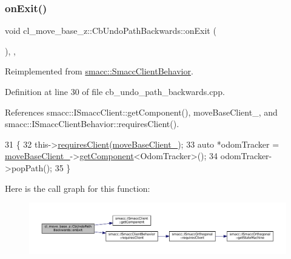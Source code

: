\subsubsection{\texorpdfstring{on\+Exit()}{onExit()}}
{\footnotesize\ttfamily void cl\+\_\+move\+\_\+base\+\_\+z\+::\+Cb\+Undo\+Path\+Backwards\+::on\+Exit (\begin{DoxyParamCaption}{ }\end{DoxyParamCaption})\hspace{0.3cm}{\ttfamily [override]}, {\ttfamily [private]}, {\ttfamily [virtual]}}



Reimplemented from \hyperlink{classsmacc_1_1SmaccClientBehavior_a7e4fb6ce81ff96dc172425852d69c0c5}{smacc\+::\+Smacc\+Client\+Behavior}.



Definition at line 30 of file cb\+\_\+undo\+\_\+path\+\_\+backwards.\+cpp.



References smacc\+::\+I\+Smacc\+Client\+::get\+Component(), move\+Base\+Client\+\_\+, and smacc\+::\+I\+Smacc\+Client\+Behavior\+::requires\+Client().


\begin{DoxyCode}
31 \{
32     this->\hyperlink{classsmacc_1_1ISmaccClientBehavior_a32b16e99e3b4cb289414203dc861a440}{requiresClient}(\hyperlink{classcl__move__base__z_1_1CbUndoPathBackwards_a306d616dab00f50141abed4bfb47aeb2}{moveBaseClient\_});
33     \textcolor{keyword}{auto} *odomTracker = \hyperlink{classcl__move__base__z_1_1CbUndoPathBackwards_a306d616dab00f50141abed4bfb47aeb2}{moveBaseClient\_}->\hyperlink{classsmacc_1_1ISmaccClient_adef78db601749ca63c19e74a27cb88cc}{getComponent}<OdomTracker>();
34     odomTracker->popPath();
35 \}
\end{DoxyCode}
Here is the call graph for this function\+:
\nopagebreak
\begin{figure}[H]
\begin{center}
\leavevmode
\includegraphics[width=350pt]{classcl__move__base__z_1_1CbUndoPathBackwards_a20cee921ad92db16f8d17c3c3b9c2daf_cgraph}
\end{center}
\end{figure}


